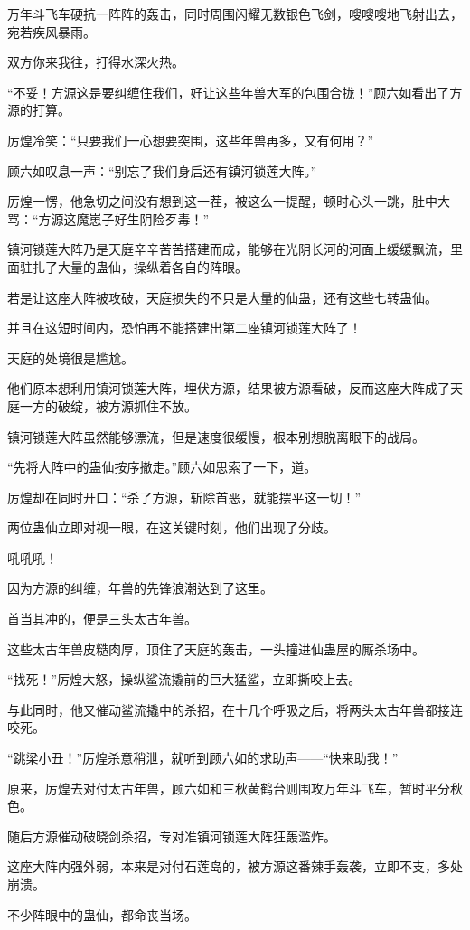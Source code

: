\begin{this_body}
万年斗飞车硬抗一阵阵的轰击，同时周围闪耀无数银色飞剑，嗖嗖嗖地飞射出去，宛若疾风暴雨。

双方你来我往，打得水深火热。

“不妥！方源这是要纠缠住我们，好让这些年兽大军的包围合拢！”顾六如看出了方源的打算。

厉煌冷笑：“只要我们一心想要突围，这些年兽再多，又有何用？”

顾六如叹息一声：“别忘了我们身后还有镇河锁莲大阵。”

厉煌一愣，他急切之间没有想到这一茬，被这么一提醒，顿时心头一跳，肚中大骂：“方源这魔崽子好生阴险歹毒！”

镇河锁莲大阵乃是天庭辛辛苦苦搭建而成，能够在光阴长河的河面上缓缓飘流，里面驻扎了大量的蛊仙，操纵着各自的阵眼。

若是让这座大阵被攻破，天庭损失的不只是大量的仙蛊，还有这些七转蛊仙。

并且在这短时间内，恐怕再不能搭建出第二座镇河锁莲大阵了！

天庭的处境很是尴尬。

他们原本想利用镇河锁莲大阵，埋伏方源，结果被方源看破，反而这座大阵成了天庭一方的破绽，被方源抓住不放。

镇河锁莲大阵虽然能够漂流，但是速度很缓慢，根本别想脱离眼下的战局。

“先将大阵中的蛊仙按序撤走。”顾六如思索了一下，道。

厉煌却在同时开口：“杀了方源，斩除首恶，就能摆平这一切！”

两位蛊仙立即对视一眼，在这关键时刻，他们出现了分歧。

吼吼吼！

因为方源的纠缠，年兽的先锋浪潮达到了这里。

首当其冲的，便是三头太古年兽。

这些太古年兽皮糙肉厚，顶住了天庭的轰击，一头撞进仙蛊屋的厮杀场中。

“找死！”厉煌大怒，操纵鲨流撬前的巨大猛鲨，立即撕咬上去。

与此同时，他又催动鲨流撬中的杀招，在十几个呼吸之后，将两头太古年兽都接连咬死。

“跳梁小丑！”厉煌杀意稍泄，就听到顾六如的求助声——“快来助我！”

原来，厉煌去对付太古年兽，顾六如和三秋黄鹤台则围攻万年斗飞车，暂时平分秋色。

随后方源催动破晓剑杀招，专对准镇河锁莲大阵狂轰滥炸。

这座大阵内强外弱，本来是对付石莲岛的，被方源这番辣手轰袭，立即不支，多处崩溃。

不少阵眼中的蛊仙，都命丧当场。


\end{this_body}
